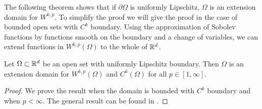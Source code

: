 \documentclass[
    a4paper,
    DIV=14,
    abstract=true,
    numbers=noenddot
]{scrartcl}
\begin{document}
The following theorem shows that if $\partial\Omega$ is uniformly Lipschitz, $\Omega$ is an extension domain for $W^{k,p}$. To simplify the proof we will give the proof in the case of bounded open sets with $C^k$ boundary. Using the approximation of Sobolev functions by functions smooth on the boundary and a change of variables, we can extend functions in $W^{k,p}(\Omega)$ to the whole of $\mathbb{R}^d$.

\begin{theorem}\label{extension}
	Let $\Omega\subset \mathbb{R}^d$ be an open set with uniformly Lipschitz boundary. Then $\Omega$ is an extension domain for $W^{k,p}(\Omega)$ and $C^k(\Omega)$ for all $p \in [1,\infty]$.
\end{theorem}
\begin{proof}
	We prove the result when the domain is bounded with $C^k$ boundary and when $p<\infty$. The general result can be found in \cite[page 424]{leoni2017first}.


\end{proof}
\end{document}

